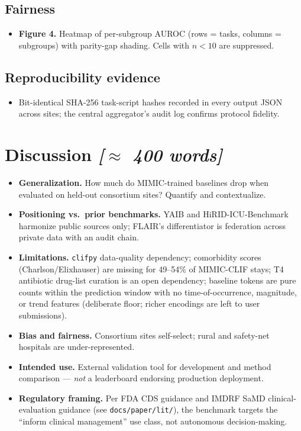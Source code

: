 \documentclass[11pt]{article}
\newcommand{\note}[1]{{\color{notecolor}\textit{[#1]}}}
\begin{document}
\subsection*{Fairness}
\begin{itemize}[leftmargin=1.5em]
  \item \textbf{Figure 4.} Heatmap of per-subgroup AUROC (rows = tasks,
        columns = subgroups) with parity-gap shading. Cells with $n<10$
        are suppressed.
\end{itemize}

\subsection*{Reproducibility evidence}
\begin{itemize}[leftmargin=1.5em]
  \item Bit-identical SHA-256 task-script hashes recorded in every output
        JSON across sites; the central aggregator's audit log confirms
        protocol fidelity.
\end{itemize}

\section{Discussion \note{$\approx$ 400 words}}
\begin{itemize}[leftmargin=1.5em]
  \item \textbf{Generalization.} How much do MIMIC-trained baselines drop
        when evaluated on held-out consortium sites? Quantify and
        contextualize.
  \item \textbf{Positioning vs.\ prior benchmarks.} YAIB
        \citep{vandewater2023yaib} and HiRID-ICU-Benchmark
        \citep{yeche2021hirid} harmonize public sources only; FLAIR's
        differentiator is federation across private data with an audit
        chain.
  \item \textbf{Limitations.}
        \texttt{clifpy} data-quality dependency; comorbidity scores
        (Charlson/Elixhauser) are missing for 49--54\% of MIMIC-CLIF
        stays; T4 antibiotic drug-list curation is an open
        dependency; baseline tokens are pure counts within the
        prediction window with no time-of-occurrence, magnitude, or
        trend features (deliberate floor; richer encodings are left to
        user submissions).
  \item \textbf{Bias and fairness.} Consortium sites self-select; rural
        and safety-net hospitals are under-represented.
  \item \textbf{Intended use.} External validation tool for development
        and method comparison --- \emph{not} a leaderboard endorsing
        production deployment.
  \item \textbf{Regulatory framing.} Per FDA CDS guidance and IMDRF SaMD
        clinical-evaluation guidance (see \texttt{docs/paper/lit/}), the
        benchmark targets the ``inform clinical management'' use class,
        not autonomous decision-making.
\end{itemize}
\end{document}
